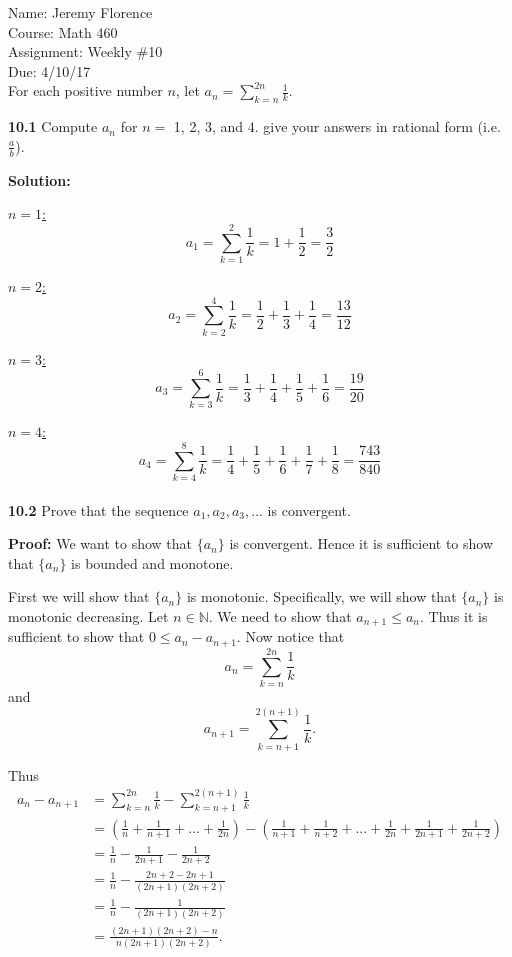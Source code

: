 \documentclass{article}
\newcommand\TheSolution{%
  \textbf{Solution:} %
}
\newcommand\Proof{%
	\textbf{Proof:} %
}
\begin{document}
Name: Jeremy Florence\\
Course: Math 460\\
Assignment: Weekly \#10\\
Due: 4/10/17\\

For each positive number $n$, let $a_n=\sum_{k=n}^{2n} \frac{1}{k}$.

\textbf{10.1} Compute $a_n$ for $n=$ 1, 2, 3, and 4. give your answers in rational form (i.e. $\frac{a}{b}$).

\TheSolution 

\underline{$n=1$:} $$a_1=\sum_{k=1}^{2} \frac{1}{k}=1+\frac{1}{2}=\frac{3}{2}$$

\underline{$n=2$:} $$a_2=\sum_{k=2}^{4}\frac{1}{k}=\frac{1}{2}+\frac{1}{3}+\frac{1}{4}=\frac{13}{12}$$

\underline{$n=3$:} $$a_3=\sum_{k=3}^{6}\frac{1}{k}=\frac{1}{3}+\frac{1}{4}+\frac{1}{5}+\frac{1}{6}=\frac{19}{20}$$

\underline{$n=4$:} $$a_4=\sum_{k=4}^{8}\frac{1}{k}=\frac{1}{4}+\frac{1}{5}+\frac{1}{6}+\frac{1}{7}+\frac{1}{8}=\frac{743}{840}$$\\

\textbf{10.2} Prove that the sequence $a_1,a_2,a_3, ...$ is convergent.

\Proof We want to show that $\{a_n\}$ is convergent. Hence it is sufficient to show that $\{a_n\}$ is bounded and monotone.

First we will show that $\{a_n\}$ is monotonic. Specifically, we will show that $\{a_n\}$ is monotonic decreasing. Let $n \in \mathbb{N}$. We need to show that $a_{n+1} \leq a_n$. Thus it is sufficient to show that $0 \leq a_n-a_{n+1}$. Now notice that $$a_n=\sum_{k=n}^{2n} \frac{1}{k}$$ and $$a_{n+1}=\sum_{k=n+1}^{2(n+1)} \frac{1}{k}.$$

Thus 
\[
    \begin{split}
		a_n-a_{n+1} &= \sum_{k=n}^{2n} \frac{1}{k}-\sum_{k=n+1}^{2(n+1)} \frac{1}{k}\\
						&= (\frac{1}{n}+\frac{1}{n+1}+...+\frac{1}{2n})-(\frac{1}{n+1}+\frac{1}{n+2}+...+\frac{1}{2n}+\frac{1}{2n+1}+\frac{1}{2n+2})\\	
						&=\frac{1}{n}-\frac{1}{2n+1}-\frac{1}{2n+2}\\
						&=\frac{1}{n}-\frac{2n+2-2n+1}{(2n+1)(2n+2)}\\
						&=\frac{1}{n}-\frac{1}{(2n+1)(2n+2)}\\
						&=\frac{(2n+1)(2n+2)-n}{n(2n+1)(2n+2)}.		
	\end{split}
\]
\end{document}
